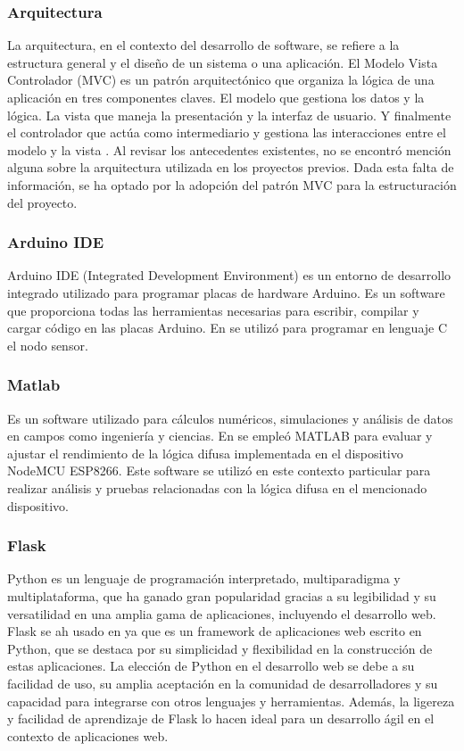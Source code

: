 \subsubsection{Arquitectura}
La arquitectura, en el contexto del desarrollo de software, se refiere a la estructura general y el diseño de un sistema o una aplicación. El Modelo Vista Controlador (MVC) es un patrón arquitectónico que organiza la lógica de una aplicación en tres componentes claves. El modelo que gestiona los datos y la lógica. La vista que maneja la presentación y la interfaz de usuario. Y finalmente el controlador que actúa como intermediario y gestiona las interacciones entre el modelo y la vista \cite{bascon_pantoja_patron_2004}. Al revisar los antecedentes existentes, no se encontró mención alguna sobre la arquitectura utilizada en los proyectos previos. Dada esta falta de información, se ha optado por la adopción del patrón MVC para la estructuración del proyecto.


\subsubsection{Arduino IDE}
Arduino IDE (Integrated Development Environment) es un entorno de desarrollo integrado utilizado para programar placas de hardware Arduino. Es un software que proporciona todas las herramientas necesarias para escribir, compilar y cargar código en las placas Arduino. En \cite{widyawati_fuzzy_2022} se utilizó para programar en lenguaje C el nodo sensor.


\subsubsection{Matlab}
Es un software utilizado para cálculos numéricos, simulaciones y análisis de datos en campos como ingeniería y ciencias. En \cite{widyawati_fuzzy_2022} se empleó MATLAB para evaluar y ajustar el rendimiento de la lógica difusa implementada en el dispositivo NodeMCU ESP8266. Este software se utilizó en este contexto particular para realizar análisis y pruebas relacionadas con la lógica difusa en el mencionado dispositivo.


\subsubsection{Flask}
Python es un lenguaje de programación interpretado, multiparadigma y multiplataforma, que ha ganado gran popularidad gracias a su legibilidad y su versatilidad en una amplia gama de aplicaciones, incluyendo el desarrollo web. Flask se ah usado en \cite{noauthor_fuzzy_2023} ya que es un framework de aplicaciones web escrito en Python, que se destaca por su simplicidad y flexibilidad en la construcción de estas aplicaciones. La elección de Python en el desarrollo web se debe a su facilidad de uso, su amplia aceptación en la comunidad de desarrolladores y su capacidad para integrarse con otros lenguajes y herramientas. Además, la ligereza y facilidad de aprendizaje de Flask lo hacen ideal para un desarrollo ágil en el contexto de aplicaciones web.

